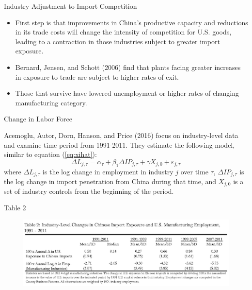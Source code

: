 \documentclass[aspectratio=169]{beamer}
\begin{document}

\begin{frame}{Industry Adjustment to Import Competition}

\begin{itemize}
    \item<1-> First step is that improvements in China’s productive capacity and reductions in its trade costs will change the intensity of competition for U.S. goods, leading to a contraction in those industries subject to greater import exposure.
    \item<2-> Bernard, Jensen, and Schott (2006) find that plants facing greater increases in exposure to trade are subject to higher rates of exit.
    \item<3-> Those that survive have lowered unemployment or higher rates of changing manufacturing category.
\end{itemize}
    
\end{frame}


\begin{frame}{Change in Labor Force}

Acemoglu, Autor, Dorn, Hanson, and Price (2016) focus on industry-level data and examine time period from 1991-2011.  They estimate the following model, similar to equation (\ref{eq:xihat}):
\begin{equation}
    \Delta L_{j,\tau} = \alpha_{\tau} + \beta_{1} \Delta IP_{j,\tau} + \gamma X_{j,0} + \varepsilon_{j,\tau}
    \label{eq:deltaL}
\end{equation}
where $ \Delta L_{j,\tau} $ is the log change in employment in industry $ j $ over time $ \tau $, $ \Delta IP_{j,\tau} $ is the log change in import penetration from China during that time, and $ X_{j,0} $ is a set of industry controls from the beginning of the period.
    
\end{frame}


\begin{frame}{Table 2}

\begin{figure}
    \centering
    \includegraphics[scale=0.8]{AutorDornHansonTable2.jpg}
    \label{fig:Table2}
\end{figure}
    
\end{frame}
\end{document}
